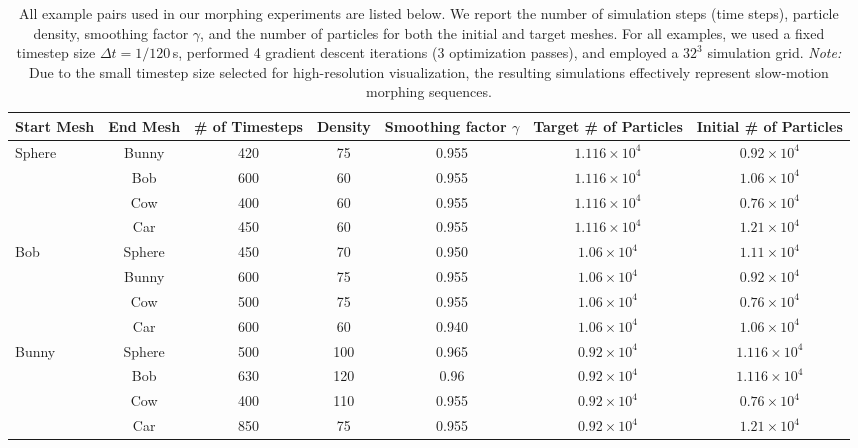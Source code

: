 \begin{table}[!ht]
\centering
\scriptsize
\caption{
    All example pairs used in our morphing experiments are listed below. 
    We report the number of simulation steps (time steps), particle density, smoothing factor $\gamma$, and the number of particles for both the initial and target meshes. 
    For all examples, we used a fixed timestep size $\Delta t = 1/120$\,s, performed 4 gradient descent iterations (3 optimization passes), and employed a $32^3$ simulation grid. 
    \textit{Note:} Due to the small timestep size selected for high-resolution visualization, the resulting simulations effectively represent slow-motion morphing sequences.
}

\begin{tabular}{l c c c c c c}
    \toprule
    \textbf{Start Mesh} & \textbf{End Mesh} & \textbf{\# of Timesteps} & \textbf{Density} & \textbf{Smoothing factor} \boldmath$\gamma$ & \textbf{Target \# of Particles} & \textbf{Initial \# of Particles} \\
    \midrule
    \multirow{4}{*}{Sphere}
      & Bunny & 420 & 75 & 0.955 & $1.116 \times 10^4$ & $0.92 \times 10^4$ \\
      & Bob   & 600 & 60 & 0.955 & $1.116 \times 10^4$ & $1.06 \times 10^4$ \\
      & Cow  & 400 & 60 & 0.955 & $1.116 \times 10^4$ & $0.76 \times 10^4$ \\
      & Car   & 450 & 60 & 0.955 & $1.116 \times 10^4$ & $1.21 \times 10^4$ \\
    \midrule
    \multirow{4}{*}{Bob}
      & Sphere & 450 & 70 & 0.950 & $1.06 \times 10^4$ & $1.11 \times 10^4$ \\
      & Bunny  & 600 & 75 & 0.955 & $1.06 \times 10^4$ & $0.92 \times 10^4$ \\
      & Cow   & 500 & 75 & 0.955 & $1.06 \times 10^4$ & $0.76 \times 10^4$ \\
      & Car    & 600 & 60 & 0.940 & $1.06 \times 10^4$ & $1.06 \times 10^4$ \\
    \midrule
    \multirow{4}{*}{Bunny}
      & Sphere & 500 & 100 & 0.965 & $0.92 \times 10^4$  & $1.116 \times 10^4$ \\
      & Bob    & 630 & 120 & 0.96  & $0.92 \times 10^4$  & $1.116 \times 10^4$ \\
      & Cow   & 400 & 110 & 0.955 & $0.92 \times 10^4$  & $0.76 \times 10^4$ \\
      & Car    & 850 & 75  & 0.955 & $0.92 \times 10^4$  & $1.21 \times 10^4$ \\

\end{tabular}
\end{table}
